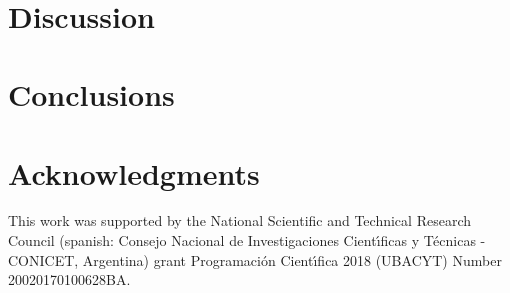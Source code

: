 \documentclass[preprint,12pt]{elsarticle}
\begin{document}
\begin{figure}[!htbp]
\centering
    \ 
    \\
\caption[width=0.47\columnwidth]{}
\label{flow_density}
\end{figure}

\section{\label{discussion}Discussion}



\section{\label{conclusions}Conclusions}

\section*{Acknowledgments}
This work was supported by the National Scientific and Technical 
Research Council (spanish: Consejo Nacional de Investigaciones Cient\'\i ficas 
y T\'ecnicas - CONICET, Argentina) grant Programaci\'on Cient\'\i fica 2018 (UBACYT) Number 20020170100628BA.

\appendix







\end{document}
